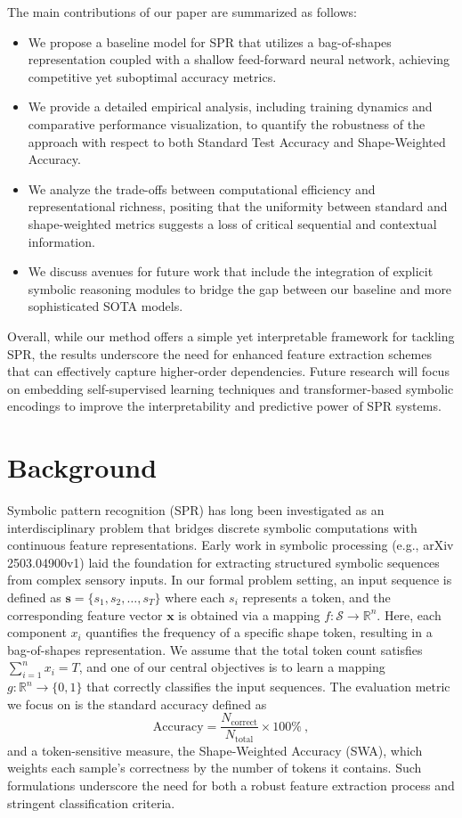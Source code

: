 \documentclass{article}
\begin{document}
The main contributions of our paper are summarized as follows:
\begin{itemize}
    \item We propose a baseline model for SPR that utilizes a bag-of-shapes representation coupled with a shallow feed-forward neural network, achieving competitive yet suboptimal accuracy metrics.
    \item We provide a detailed empirical analysis, including training dynamics and comparative performance visualization, to quantify the robustness of the approach with respect to both Standard Test Accuracy and Shape-Weighted Accuracy.
    \item We analyze the trade-offs between computational efficiency and representational richness, positing that the uniformity between standard and shape-weighted metrics suggests a loss of critical sequential and contextual information.
    \item We discuss avenues for future work that include the integration of explicit symbolic reasoning modules to bridge the gap between our baseline and more sophisticated SOTA models.
\end{itemize}
Overall, while our method offers a simple yet interpretable framework for tackling SPR, the results underscore the need for enhanced feature extraction schemes that can effectively capture higher-order dependencies. Future research will focus on embedding self-supervised learning techniques and transformer-based symbolic encodings to improve the interpretability and predictive power of SPR systems.

\section{Background}
Symbolic pattern recognition (SPR) has long been investigated as an interdisciplinary problem that bridges discrete symbolic computations with continuous feature representations. Early work in symbolic processing (e.g., arXiv 2503.04900v1) laid the foundation for extracting structured symbolic sequences from complex sensory inputs. In our formal problem setting, an input sequence is defined as \(\boldsymbol{s} = \{s_1, s_2, \dots, s_T\}\) where each \(s_i\) represents a token, and the corresponding feature vector \(\boldsymbol{x}\) is obtained via a mapping \(f: \mathcal{S} \rightarrow \mathbb{R}^{n}\). Here, each component \(x_i\) quantifies the frequency of a specific shape token, resulting in a bag-of-shapes representation. We assume that the total token count satisfies \(\sum_{i=1}^{n} x_i = T\), and one of our central objectives is to learn a mapping \(g: \mathbb{R}^{n} \rightarrow \{0, 1\}\) that correctly classifies the input sequences. The evaluation metric we focus on is the standard accuracy defined as
\[
\text{Accuracy} = \frac{N_{\text{correct}}}{N_{\text{total}}} \times 100\%\ ,
\]
and a token-sensitive measure, the Shape-Weighted Accuracy (SWA), which weights each sample’s correctness by the number of tokens it contains. Such formulations underscore the need for both a robust feature extraction process and stringent classification criteria.
\end{document}
